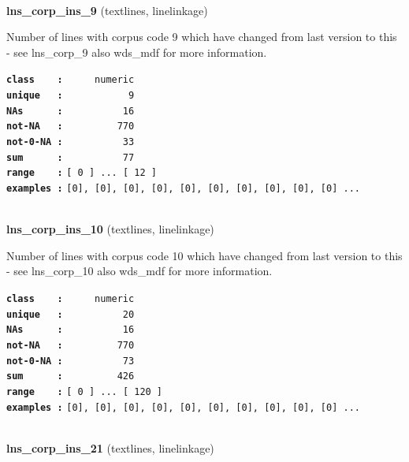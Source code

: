 \documentclass[]{article}
\begin{document}
~

\textbf{lns\_corp\_ins\_9} (textlines, linelinkage)

Number of lines with corpus code 9 which have changed from last version
to this - see lns\_corp\_9 also wds\_mdf for more information.

\textbf{\texttt{class\ \ \ \ :}} \texttt{~~~~~numeric}\\
\textbf{\texttt{unique\ \ \ :}} \texttt{~~~~~~~~~~~9}\\
\textbf{\texttt{NAs\ \ \ \ \ \ :}} \texttt{~~~~~~~~~~16}\\
\textbf{\texttt{not-NA\ \ \ :}} \texttt{~~~~~~~~~770}\\
\textbf{\texttt{not-0-NA\ :}} \texttt{~~~~~~~~~~33}\\
\textbf{\texttt{sum\ \ \ \ \ \ :}} \texttt{~~~~~~~~~~77}\\
\textbf{\texttt{range\ \ \ \ :}}
\texttt{{[}\ 0\ {]}\ ...\ {[}\ 12\ {]}}\\
\textbf{\texttt{examples\ :}}
\texttt{{[}0{]},\ {[}0{]},\ {[}0{]},\ {[}0{]},\ {[}0{]},\ {[}0{]},\ {[}0{]},\ {[}0{]},\ {[}0{]},\ {[}0{]}\ ...}\\

~

\textbf{lns\_corp\_ins\_10} (textlines, linelinkage)

Number of lines with corpus code 10 which have changed from last version
to this - see lns\_corp\_10 also wds\_mdf for more information.

\textbf{\texttt{class\ \ \ \ :}} \texttt{~~~~~numeric}\\
\textbf{\texttt{unique\ \ \ :}} \texttt{~~~~~~~~~~20}\\
\textbf{\texttt{NAs\ \ \ \ \ \ :}} \texttt{~~~~~~~~~~16}\\
\textbf{\texttt{not-NA\ \ \ :}} \texttt{~~~~~~~~~770}\\
\textbf{\texttt{not-0-NA\ :}} \texttt{~~~~~~~~~~73}\\
\textbf{\texttt{sum\ \ \ \ \ \ :}} \texttt{~~~~~~~~~426}\\
\textbf{\texttt{range\ \ \ \ :}}
\texttt{{[}\ 0\ {]}\ ...\ {[}\ 120\ {]}}\\
\textbf{\texttt{examples\ :}}
\texttt{{[}0{]},\ {[}0{]},\ {[}0{]},\ {[}0{]},\ {[}0{]},\ {[}0{]},\ {[}0{]},\ {[}0{]},\ {[}0{]},\ {[}0{]}\ ...}\\

~

\textbf{lns\_corp\_ins\_21} (textlines, linelinkage)
\end{document}
